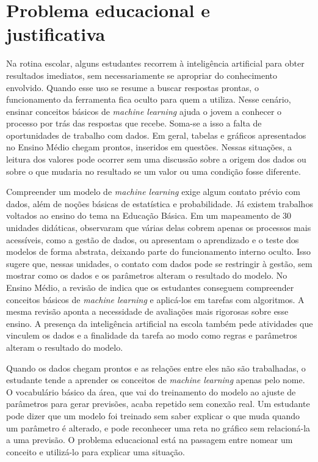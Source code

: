 \section{Problema educacional e justificativa}

Na rotina escolar, alguns estudantes recorrem à inteligência artificial para obter resultados imediatos, sem necessariamente se apropriar do conhecimento envolvido. Quando esse uso se resume a buscar respostas prontas, o funcionamento da ferramenta fica oculto para quem a utiliza. Nesse cenário, ensinar conceitos básicos de \textit{machine learning} ajuda o jovem a conhecer o processo por trás das respostas que recebe. Soma-se a isso a falta de oportunidades de trabalho com dados. Em geral, tabelas e gráficos apresentados no Ensino Médio chegam prontos, inseridos em questões. Nessas situações, a leitura dos valores pode ocorrer sem uma discussão sobre a origem dos dados ou sobre o que mudaria no resultado se um valor ou uma condição fosse diferente.

Compreender um modelo de \textit{machine learning} exige algum contato prévio com dados, além de noções básicas de estatística e probabilidade. Já existem trabalhos voltados ao ensino do tema na Educação Básica. Em um mapeamento de 30 unidades didáticas,  observaram que várias delas cobrem apenas os processos mais acessíveis, como a gestão de dados, ou apresentam o aprendizado e o teste dos modelos de forma abstrata, deixando parte do funcionamento interno oculto. Isso sugere que, nessas unidades, o contato com dados pode se restringir à gestão, sem mostrar como os dados e os parâmetros alteram o resultado do modelo. No Ensino Médio, a revisão de  indica que os estudantes conseguem compreender conceitos básicos de \textit{machine learning} e aplicá-los em tarefas com algoritmos. A mesma revisão aponta a necessidade de avaliações mais rigorosas sobre esse ensino. A presença da inteligência artificial na escola também pede atividades que vinculem os dados e a finalidade da tarefa ao modo como regras e parâmetros alteram o resultado do modelo.

Quando os dados chegam prontos e as relações entre eles não são trabalhadas, o estudante tende a aprender os conceitos de \textit{machine learning} apenas pelo nome. O vocabulário básico da área, que vai do treinamento do modelo ao ajuste de parâmetros para gerar previsões, acaba repetido sem conexão real. Um estudante pode dizer que um modelo foi treinado sem saber explicar o que muda quando um parâmetro é alterado, e pode reconhecer uma reta no gráfico sem relacioná-la a uma previsão. O problema educacional está na passagem entre nomear um conceito e utilizá-lo para explicar uma situação.

